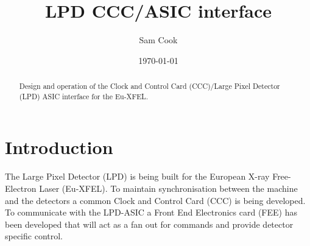 \documentclass[]{article}
\title{LPD CCC/ASIC interface}
\author{ Sam Cook }
\date{\today}
\begin{document}
    \ifpdf
    \else
    \fi

    \maketitle

    \begin{abstract}
        Design and operation of the Clock and Control Card (CCC)/Large Pixel Detector (LPD) ASIC interface for the Eu-XFEL. 
    \end{abstract}
    \tableofcontents
    \section{Introduction} %
    \label{sec:introduction}
    The Large Pixel Detector (LPD) is being built for the European X-ray Free-Electron Laser (Eu-XFEL). To maintain synchronisation between the machine and the detectors a common Clock and Control Card (CCC) is being developed. To communicate with the LPD-ASIC a Front End Electronics card (FEE) has been developed that will act as a fan out for commands and provide detector specific control.
    
\end{document}
